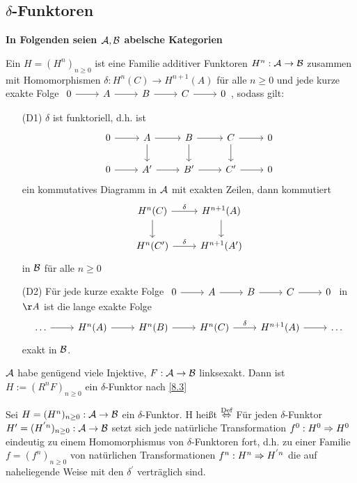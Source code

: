 \subsection{$\delta$-Funktoren}
\begin{center}
	\textbf{In Folgenden seien $\mathcal{A}, \mathcal{B}$ abelsche Kategorien}
\end{center}
\begin{df}\label{9.1}
	Ein  $H=(H^n)_{n\geq 0}$ ist eine Familie additiver Funktoren $H^n:\mathcal{A} \to \mathcal{B}$ zusammen mit Homomorphismen $\delta:H^n(C) \to H^{n+1}(A)$ für alle $n\geq 0$ und jede kurze exakte Folge $\begin{tikzcd}
	0\arrow{r} & A \arrow{r} & B\arrow{r} & C \arrow{r} & 0
	\end{tikzcd}$, sodass gilt:
	\begin{enumerate}
		\item[(D1)] $\delta$ ist funktoriell, d.h. ist 
		$$\begin{tikzcd}
		0\arrow{r} & A\arrow{d} \arrow{r} & B\arrow{r} \arrow{d}& C\arrow{d} \arrow{r} & 0\\
		0\arrow{r} & A' \arrow{r} & B'\arrow{r} & C' \arrow{r} & 0
		\end{tikzcd} $$
		ein kommutatives Diagramm in $\mathcal{A}$ mit exakten Zeilen, dann kommutiert 
		$$\begin{tikzcd}
		H^n(C) \arrow{d}\arrow{r}{\delta} & H^{n+1}(A) \arrow{d} \\
		H^n(C') \arrow{r}{\delta} & H^{n+1}(A')
		\end{tikzcd}$$
		in $\mathcal{B}$ für alle $n\geq 0$
		\item[(D2)] Für jede kurze exakte Folge $\begin{tikzcd}
		0\arrow{r} & A \arrow{r} & B\arrow{r} & C \arrow{r} & 0
		\end{tikzcd}$ in $\AA$ ist die lange exakte Folge 
		$$\begin{tikzcd}
		\ldots \arrow{r} & H^n(A) \arrow{r} & H^n(B) \arrow{r}& H^n(C) \arrow{r}{\delta} & H^{n+1}(A) \arrow{r} & \ldots
		\end{tikzcd}$$
		exakt in $\mathcal{B}$.
	\end{enumerate}
\end{df}
\begin{bsp}
	$\mathcal{A}$ habe genügend viele Injektive, $F:\mathcal{A} \to \mathcal{B}$ linksexakt. Dann ist $H:=(R^nF)_{n\geq 0}$ ein $\delta$-Funktor nach \ref{8.3}
\end{bsp}
\begin{df}\label{9.3}
	Sei $H=(H^n)_{n\geq 0}: \mathcal{A} \to \mathcal{B} $ ein $\delta$-Funktor. H heißt  $\overset{\text{Def}}{\Leftrightarrow} $ Für jeden $\delta$-Funktor $H'=(H^{'n})_{n\geq 0}: \mathcal{A} \to \mathcal{B} $ setzt sich jede natürliche Transformation $ f^0: H^0 \Rightarrow H^0 $ eindeutig zu einem Homomorphismus von $\delta$-Funktoren fort, d.h. zu einer Familie $f=(f^{n})_{n \geq 0}$ von natürlichen Transformationen $f^{n}: H^{n} \Rightarrow H^{'n} $ die auf naheliegende Weise mit den $\delta^{'}$ verträglich sind.
\end{df}
